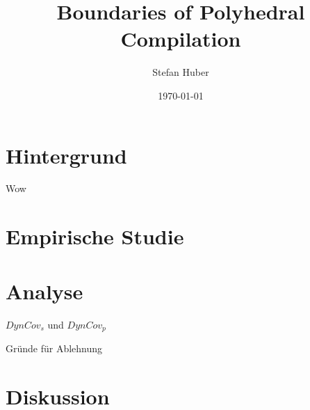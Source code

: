 \documentclass[xcolor=dvipsnames]{beamer}
\title[Eine empirische Studie]{Boundaries of Polyhedral Compilation}
\author{Stefan Huber}
\institute{
    Fakultät für Informatik und Mathematik\\
    Universität Passau
}
\date{\today}
\begin{document}
\frame{\titlepage}

\section{Hintergrund}

\begin{frame}
    Wow
\end{frame}

\section{Empirische Studie}

\section{Analyse}
\begin{frame}{\(DynCov_s\) und \(DynCov_p\)}
    \begin{figure}[!h]
        
    \end{figure}
\end{frame}
\begin{frame}{Gründe für Ablehnung}
    \begin{figure}[!h]
        
     \end{figure}
\end{frame}

\section{Diskussion}
\end{document}
